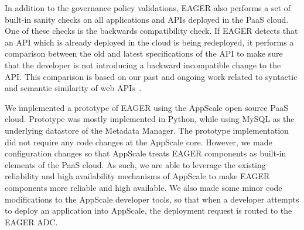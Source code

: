 In addition to the governance policy validations, EAGER also performs a set of built-in
sanity checks on all applications and APIs deployed in the PaaS cloud. One of these checks
is the backwards compatibility check. If EAGER detects that an API which is already deployed in
the cloud is being redeployed, it performs a comparison between the old
and latest specifications of the API to make sure that the developer is not introducing a backward
incompatible change to the API. This comparison is based on our past and ongoing work related
to syntactic and semantic similarity of web APIs~\cite{6930607}.

We implemented a prototype of EAGER using the AppScale open source PaaS cloud.  Prototype
was mostly implemented in Python, while using MySQL as the underlying datastore of the 
Metadata Manager. The prototype implementation did not require any code changes at the AppScale core.
However, we made configuration changes so that AppScale treats
EAGER components as built-in elements of the PaaS cloud.  As such, we 
are able to leverage the existing reliability and high availability mechanisms of AppScale to make 
EAGER components more reliable and high available. We also made some minor code modifications to the
AppScale developer tools, so that when a developer attempts to deploy an application into AppScale,
the deployment request is routed to the EAGER ADC.
